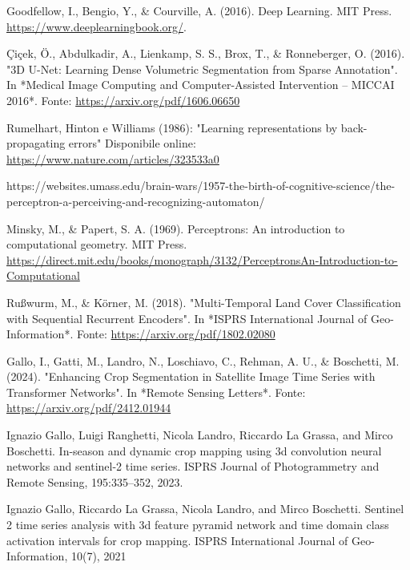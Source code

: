 \begin{thebibliography}{99}
\hspace{0.10cm}
Goodfellow, I., Bengio, Y., \& Courville, A. (2016). Deep Learning. MIT Press. 
\url{https://www.deeplearningbook.org/}.

\hspace{0.10cm}
Çiçek, Ö., Abdulkadir, A., Lienkamp, S. S., Brox, T., \& Ronneberger, O. (2016). 
"3D U-Net: Learning Dense Volumetric Segmentation from Sparse Annotation". 
In *Medical Image Computing and Computer-Assisted Intervention – MICCAI 2016*. 
Fonte: \url{https://arxiv.org/pdf/1606.06650}

\hspace{0.10cm}
Rumelhart, Hinton e Williams (1986): "Learning 
representations by back-propagating errors"
Disponibile online: \url{https://www.nature.com/articles/323533a0}

\hspace{0.10cm}
https://websites.umass.edu/brain-wars/1957-the-birth-of-cognitive-science/the-perceptron-a-perceiving-and-recognizing-automaton/

\hspace{0.10cm}
Minsky, M., \& Papert, S. A. (1969). Perceptrons: An introduction to 
computational geometry. MIT Press.
\url{https://direct.mit.edu/books/monograph/3132/PerceptronsAn-Introduction-to-Computational}

\newpage
\hspace{0.10cm}
Rußwurm, M., \& Körner, M. (2018). 
"Multi-Temporal Land Cover Classification with Sequential Recurrent Encoders". 
In *ISPRS International Journal of Geo-Information*. 
Fonte: \url{https://arxiv.org/pdf/1802.02080}


\hspace{0.10cm}
Gallo, I., Gatti, M., Landro, N., Loschiavo, C., Rehman, A. U., \& Boschetti, M. (2024). 
"Enhancing Crop Segmentation in Satellite Image Time Series with Transformer Networks". 
In *Remote Sensing Letters*.
Fonte: \url{https://arxiv.org/pdf/2412.01944}

\hspace{0.10cm}
Ignazio Gallo, Luigi Ranghetti, Nicola Landro, Riccardo La Grassa, and Mirco Boschetti. In-season and dynamic
crop mapping using 3d convolution neural networks and sentinel-2 time series. ISPRS Journal of Photogrammetry
and Remote Sensing, 195:335–352, 2023.

\hspace{0.10cm}
Ignazio Gallo, Riccardo La Grassa, Nicola Landro, and Mirco Boschetti. Sentinel 2 time series analysis with
3d feature pyramid network and time domain class activation intervals for crop mapping. ISPRS International
Journal of Geo-Information, 10(7), 2021

\end{thebibliography}

